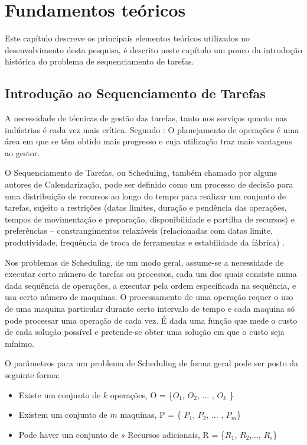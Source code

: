 \chapter{Fundamentos teóricos}\label{fundamentos}

Este capítulo descreve os principais elementos teóricos utilizados no
desenvolvimento desta pesquisa, é descrito neste capítulo um pouco da introdução histórica do problema de sequenciamento de tarefas.
\section{Introdução ao Sequenciamento de Tarefas}\label{sec:int_seq_tarefas}

A necessidade de técnicas de gestão das tarefas, tanto nos serviços quanto nas indústrias é cada vez mais crítica. Segundo : O planejamento de operações é uma área em que se têm obtido mais progresso e cuja utilização traz mais vantagens ao gestor. 


O Sequenciamento de Tarefas, ou Scheduling, também chamado por alguns autores de Calendarização, pode ser definido como um processo de decisão para uma distribuição de recursos ao longo do tempo para realizar um conjunto de tarefas, sujeito a restrições (datas limites, duração e pendência das operações, tempos de movimentação e preparação, disponibilidade e partilha de recursos) e preferências – constrangimentos relaxáveis (relacionadas com datas limite, produtividade, frequência de troca de ferramentas e estabilidade da fábrica) \cite{LEPAPE}.

Nos problemas de Scheduling, de um modo geral, assume-se a necessidade de executar certo número de tarefas ou processos, cada um dos quais consiste numa dada sequência de operações, a executar pela ordem especificada na sequência, e usa certo número de maquinas. O processamento de uma operação requer o uso de uma maquina particular durante certo intervalo de tempo e cada maquina só pode processar uma operação de cada vez. É dada uma função que mede o custo de cada solução possível e pretende-se obter uma solução em que o custo seja mínimo.


O parâmetros para um problema de Scheduling de forma geral pode ser posto da seguinte forma:
\begin{itemize}
\item Existe um conjunto de $k$ operações, O = \{$O_{1}$, $O_{2}$, ... , $O_{k}$ \}
\item Existem um conjunto de $m$ maquinas, P = \{ $P_{1}$, $P_{2}$, ... , $P_{m}$\}
\item Pode haver um conjunto de $s$ Recursos adicionais, R = \{$R_{1}$, $R_{2}$,..., $R_{s}$\}

\end{itemize}


